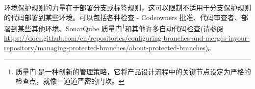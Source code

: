 环境保护规则的力量在于部署分支或标签规则，这可以限制不适用于分支保护规则的代码部署到某些环境。可以包括各种检查 - Codeowners 批准、代码审查者、部署到某些其他环境、SonarQube 质量门\footnote{质量门:是一种创新的管理策略，它将产品设计流程中的关键节点设定为严格的检查点，就像一道道严密的门坎。}和其他许多自动代码检查(请参阅\url{https://docs.github.com/en/repositories/configuring-branches-and-merges-inyour-repository/managing-protected-branches/about-protected-branches})。

























